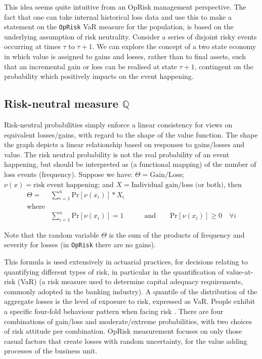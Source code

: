 \documentclass[a4paper]{article}
\begin{document}
This idea seems quite intuitive from an OpRisk management perspective. The fact that one can take internal historical loss data and use this to make a statement on the \texttt{OpRisk} VaR measure for the population, is based on the underlying assumption of risk neutrality. Consider a series of disjoint risky events occurring at times $\tau$ to $\tau + 1$.  We can explore the concept of a two state economy in which value is assigned to gains and losses, rather than to final assets, such that an incremental gain or loss can be realised at state $\tau + 1$, contingent on the probability which positively impacts on the event happening.  \medskip

\subsection{Risk-neutral measure $\mathbb{Q}$}

Risk-neutral probabilities simply enforce a linear consistency for views on equivalent losses/gains, with regard to the shape of the value function. The shape the graph depicts a linear relationship based on responses to gains/losses and value. The risk neutral probability is not the real probability of an event happening, but should be interpreted as (a functional mapping) of the number of loss events (frequency). Suppose we have: $\Theta = \mbox{Gain/Loss}$; $\nu(x) = \mbox{risk event happening}$; and $X = \mbox{Individual gain/loss (or both)}$, then
\begin{eqnarray}\label{eqn3}
\Theta = &\sum_{i=1}^{n}\mbox{Pr}[\nu (x_{i})]*X_i & \\
 \mbox{where} \nonumber\\
&\sum_{i=1}^{n}\mbox{Pr}[\nu (x_{i})] = 1 &\qquad \mbox{and} \qquad \mbox{Pr}[\nu (x_{i})] \geq 0 \quad \forall i\nonumber
\end{eqnarray}         

Note that the random variable $\Theta$ is the sum of the products of frequency and severity for losses (in \texttt{OpRisk} there are no gains).\medskip

This formula is used extensively in actuarial practices, for decisions relating to quantifying different types of risk, in particular in the quantification of value-at-risk (VaR) (a risk measure used to determine capital adequacy requirements, commonly adopted in the banking industry). A quantile of the distribution of the aggregate losses is the level of exposure to risk, expressed as VaR. People exhibit a specific four-fold behaviour pattern when facing risk \citep{shefrin2016behavioral}. There are four combinations of gain/loss and moderate/extreme probabilities, with two choices of risk attitude per combination. OpRisk measurement focuses on only those casual factors that create losses with random uncertainty, for the value adding processes of the business unit.
\end{document}
